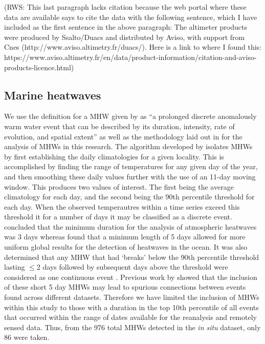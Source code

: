 \documentclass[a4paper,10pt,review]{elsarticle}
\begin{document}
(RWS: This last paragraph lacks citation because the web portal where these data are available says to cite the data with the following sentence, which I have included as the first sentence in the above paragraph:
The altimeter products were produced by Ssalto/Duacs and distributed by Aviso, with support from Cnes (http://www.aviso.altimetry.fr/duacs/).
Here is a link to where I found this:
https://www.aviso.altimetry.fr/en/data/product-information/citation-and-aviso-products-licence.html)

\subsection{Marine heatwaves}
We use the definition for a MHW given by \citet{Hobday2016} as ``a prolonged discrete anomalously warm water event that can be described by its duration, intensity, rate of evolution, and spatial extent'' as well as the methodology laid out in \citet{Hobday2016} for the analysis of MHWs in this research. The algorithm developed by \citet{Hobday2016} isolates MHWs by first establishing the daily climatologies for a given locality. This is accomplished by finding the range of temperatures for any given day of the year, and then smoothing these daily values further with the use of an 11-day moving window. This produces two values of interest. The first being the average climatology for each day, and the second being the 90th percentile threshold for each day. When the observed temperautres within a time series exceed this threshold it for a number of days it may be classified as a discrete event. \citet{Perkins2013} concluded that the minimum duration for the analysis of atmospheric heatwaves was 3 days whereas \citet{Hobday2016} found that a minimum length of 5 days allowed for more uniform global results for the detection of heatwaves in the ocean. It was also determined that any MHW that had `breaks' below the 90th percentile threshold lasting $\leq$2 days followed by subsequent days above the threshold were considered as one continuous event \citep{Hobday2016}. Previous work by \citet{Schlegel2017} showed that the inclusion of these short 5 day MHWs may lead to spurious connections between events found across different datasets. Therefore we have limited the inclusion of MHWs within this study to those with a duration in the top 10th percentile of all events that occurred within the range of dates available for the reanalysis and remotely sensed data. Thus, from the 976 total MHWs detected in the \emph{in situ} dataset, only 86 were taken.
\end{document}
